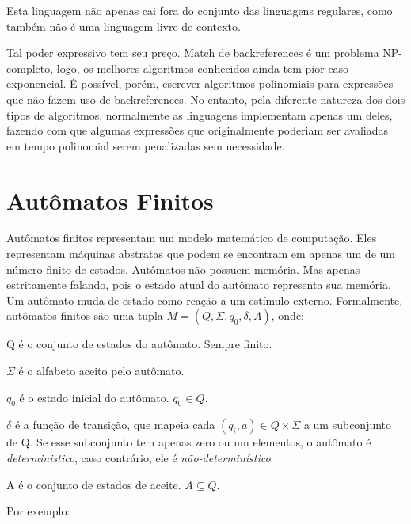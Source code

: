 \documentclass[a4paper,12pt,oneside,onecolumn]{uerj}
\begin{document}
Esta linguagem não apenas cai fora do conjunto das linguagens regulares, como também não é uma linguagem livre de contexto.

Tal poder expressivo tem seu preço. Match de backreferences é um problema NP-completo, logo, os melhores algoritmos conhecidos ainda tem pior caso exponencial. É possível, porém, escrever algoritmos polinomiais para expressões que não fazem uso de backreferences. No entanto, pela diferente natureza dos dois tipos de algoritmos, normalmente as linguagens implementam apenas um deles, fazendo com que algumas expressões que originalmente poderiam ser avaliadas em tempo polinomial serem penalizadas sem necessidade.

\section{Autômatos Finitos}

Autômatos finitos representam um modelo matemático de computação. Eles representam máquinas abstratas que podem se encontram em apenas um de um número finito de estados. Autômatos não possuem memória. Mas apenas estritamente falando, pois o estado atual do autômato representa sua memória. Um autômato muda de estado como reação a um estímulo externo. Formalmente, autômatos finitos são uma tupla $M = (Q, \Sigma, q_0, \delta, A)$, onde:

\begin{lcircp}
    \item Q é o conjunto de estados do autômato. Sempre finito.
    \item $\Sigma$ é o alfabeto aceito pelo autômato.
    \item $q_0$ é o estado inicial do autômato. $q_0 \in Q$.
    \item $\delta$ é a função de transição, que mapeia cada $(q_i, a) \in Q \times \Sigma$ a um subconjunto de Q. Se esse subconjunto tem apenas zero ou um elementos, o autômato é \emph{deterministico}, caso contrário, ele é \emph{não-determinístico}.
    \item A é o conjunto de estados de aceite. $A \subseteq Q$.
\end{lcircp}

Por exemplo:
\end{document}
